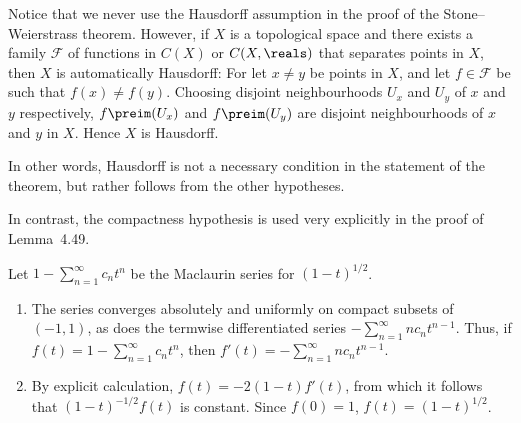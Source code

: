 \documentclass[article, a4paper, 11pt, oneside]{memoir}
\numberwithin{equation}{chapter}
\newcommand{\calF}{\mathcal{F}}
\theoremstyle{nonumberplain}
\begin{document}
\begin{remark}
	Notice that we never use the Hausdorff assumption in the proof of the Stone--Weierstrass theorem. However, if $X$ is a topological space and there exists a family $\calF$ of functions in $C(X)$ or $C(X,\reals)$ that separates points in $X$, then $X$ is automatically Hausdorff: For let $x \neq y$ be points in $X$, and let $f \in \calF$ be such that $f(x) \neq f(y)$. Choosing disjoint neighbourhoods $U_x$ and $U_y$ of $x$ and $y$ respectively, $f\preim(U_x)$ and $f\preim(U_y)$ are disjoint neighbourhoods of $x$ and $y$ in $X$. Hence $X$ is Hausdorff.

	In other words, Hausdorff is not a necessary condition in the statement of the theorem, but rather follows from the other hypotheses.

	In contrast, the compactness hypothesis is used very explicitly in the proof of Lemma~4.49.
\end{remark}

\begin{exerciseframed*}[66]
	Let $1 - \sum_{n=1}^\infty c_n t^n$ be the Maclaurin series for $(1 - t)^{1/2}$.
	\begin{enumerate}
		\item The series converges absolutely and uniformly on compact subsets of $(-1,1)$, as does the termwise differentiated series $- \sum_{n=1}^\infty n c_n t^{n-1}$. Thus, if $f(t) = 1 - \sum_{n=1}^\infty c_n t^n$, then $f'(t) = - \sum_{n=1}^\infty n c_n t^{n-1}$.

		\item By explicit calculation, $f(t) = -2(1-t) f'(t)$, from which it follows that $(1-t)^{-1/2} f(t)$ is constant. Since $f(0) = 1$, $f(t) = (1-t)^{1/2}$.
	\end{enumerate}
\end{exerciseframed*}
\end{document}
